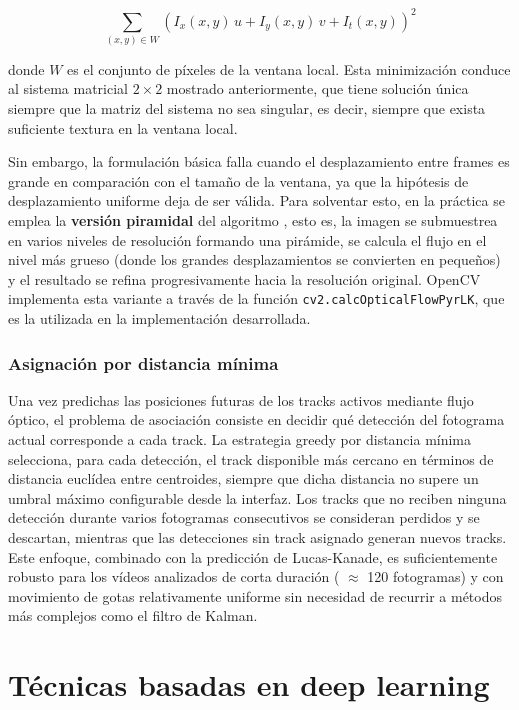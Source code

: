 \begin{equation}
    \sum_{(x,y) \in W} \left( I_x(x,y)\, u + I_y(x,y)\, v + I_t(x,y) \right)^2
\end{equation}

donde $W$ es el conjunto de píxeles de la ventana local. Esta minimización conduce al sistema matricial $2\times2$ mostrado anteriormente, que tiene solución única siempre que la matriz del sistema no sea singular, es decir, siempre que exista suficiente textura en la ventana local.

Sin embargo, la formulación básica falla cuando el desplazamiento entre frames es grande en comparación con el tamaño de la ventana, ya que la hipótesis de desplazamiento uniforme deja de ser válida. Para solventar esto, en la práctica se emplea la \textbf{versión piramidal} del algoritmo \cite{bouguet2001pyramidal}, esto es, la imagen se submuestrea en varios niveles de resolución formando una pirámide, se calcula el flujo en el nivel más grueso (donde los grandes desplazamientos se convierten en pequeños) y el resultado se refina progresivamente hacia la resolución original. OpenCV implementa esta variante a través de la función \texttt{cv2.calcOpticalFlowPyrLK}, que es la utilizada en la implementación desarrollada.

\subsubsection{Asignación por distancia mínima}

Una vez predichas las posiciones futuras de los tracks activos mediante flujo óptico, el problema de asociación consiste en decidir qué detección del fotograma actual corresponde a cada track. La estrategia greedy por distancia mínima selecciona, para cada detección, el track disponible más cercano en términos de distancia euclídea entre centroides, siempre que dicha distancia no supere un umbral máximo configurable desde la interfaz. Los tracks que no reciben ninguna detección durante varios fotogramas consecutivos se consideran perdidos y se descartan, mientras que las detecciones sin track asignado generan nuevos tracks.
Este enfoque, combinado con la predicción de Lucas-Kanade, es suficientemente robusto para los vídeos analizados de corta duración ( $\approx$ 120 fotogramas) y con movimiento de gotas relativamente uniforme sin necesidad de recurrir a métodos más complejos como el filtro de Kalman.

\section{Técnicas basadas en deep learning}

